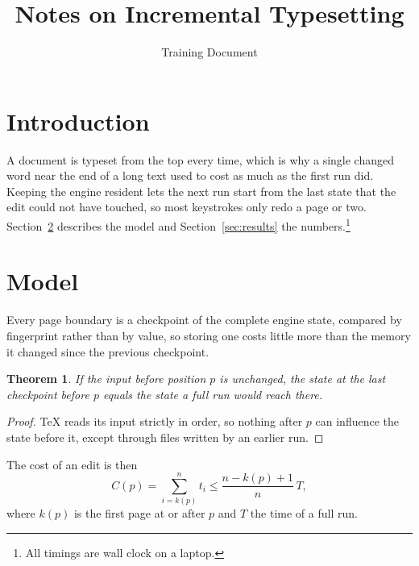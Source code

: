 \documentclass[11pt]{article}
\title{Notes on Incremental Typesetting}
\author{Training Document}
\newtheorem{theorem}{Theorem}
\begin{document}
\maketitle
\tableofcontents

\section{Introduction}\label{sec:intro}
A document is typeset from the top every time, which is why a single changed word
near the end of a long text used to cost as much as the first run did.
Keeping the engine resident lets the next run start from the last state that the
edit could not have touched, so most keystrokes only redo a page or two.
Section~\ref{sec:model} describes the model and Section~\ref{sec:results} the
numbers.\footnote{All timings are wall clock on a laptop.}

\lipsum[1-6]

\section{Model}\label{sec:model}
Every page boundary is a checkpoint of the complete engine state, compared by
fingerprint rather than by value, so storing one costs little more than the
memory it changed since the previous checkpoint.
\begin{theorem}\label{thm:sound}
If the input before position $p$ is unchanged, the state at the last checkpoint
before $p$ equals the state a full run would reach there.
\end{theorem}
\begin{proof}
TeX reads its input strictly in order, so nothing after $p$ can influence the
state before it, except through files written by an earlier run.
\end{proof}
The cost of an edit is then
\begin{equation}\label{eq:cost}
  C(p) = \sum_{i = k(p)}^{n} t_i \leq \frac{n - k(p) + 1}{n} \, T,
\end{equation}
where $k(p)$ is the first page at or after $p$ and $T$ the time of a full run.

\lipsum[7-12]
\end{document}
